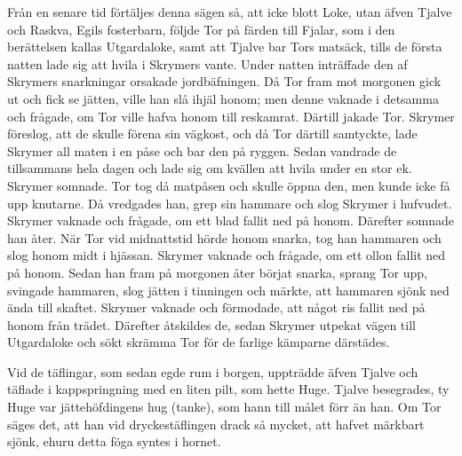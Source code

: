 Från en senare tid förtäljes denna sägen så, att icke blott Loke, utan
äfven Tjalve och Raskva, Egils fosterbarn, följde Tor på färden till
Fjalar, som i den berättelsen kallas Utgardaloke, samt att Tjalve bar
Tors matsäck, tills de första
natten lade sig att hvila i Skrymers vante. Under natten inträffade den
af Skrymers snarkningar orsakade jordbäfningen. Då Tor fram mot morgonen
gick ut och fick se jätten, ville han slå ihjäl honom; men denne vaknade
i detsamma och frågade, om Tor ville hafva honom till reskamrat. Därtill
jakade Tor. Skrymer föreslog, att de skulle förena sin vägkost, och då
Tor därtill samtyckte, lade Skrymer all maten i en påse och bar den på
ryggen. Sedan vandrade de tillsammans hela dagen och lade sig om kvällen
att hvila under en stor ek. Skrymer somnade. Tor tog då matpåsen och
skulle öppna den, men kunde icke få upp knutarne. Då vredgades han, grep
sin hammare och slog Skrymer i hufvudet. Skrymer vaknade och frågade, om
ett blad fallit ned på honom. Därefter somnade han åter. När Tor vid
midnattstid hörde honom snarka, tog han hammaren och slog honom midt i
hjässan. Skrymer vaknade och frågade, om ett ollon fallit ned på honom.
Sedan han fram på morgonen åter börjat snarka, sprang Tor upp, svingade
hammaren, slog jätten i tinningen och märkte, att hammaren sjönk ned
ända till skaftet. Skrymer vaknade och förmodade, att något ris fallit
ned på honom från trädet. Därefter åtskildes de, sedan Skrymer utpekat
vägen till Utgardaloke och sökt skrämma Tor för de farlige kämparne
därstädes.

Vid de täflingar, som sedan egde rum i borgen, uppträdde äfven Tjalve
och täflade i kappspringning med en liten pilt, som hette Huge. Tjalve
besegrades, ty Huge var jättehöfdingens hug (tanke), som hann till målet
förr än han. Om Tor säges det, att han vid dryckestäflingen drack så
mycket, att hafvet märkbart sjönk, ehuru detta föga syntes i hornet.



